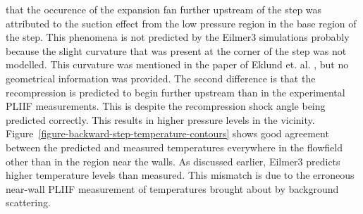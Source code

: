 that the occurence of the expansion fan further upstream of the step was
attributed to the suction effect from the low pressure region in the base region
of the step. This phenomena is not predicted by the Eilmer3 simulations probably because
the slight curvature that was present at the corner of the step was not modelled. 
This curvature was mentioned in the paper of Eklund et. al. \cite{Eklund1995}, but no geometrical
information was provided. The second difference is that the recompression is predicted 
to begin further upstream than in the experimental PLIIF measurements. This is 
despite the recompression shock angle being predicted correctly. This results in 
higher pressure levels in the vicinity.
Figure~\ref{figure-backward-step-temperature-contours} shows good agreement between 
the predicted and measured temperatures everywhere in the flowfield other than in 
the region near the walls. As discussed earlier, Eilmer3 predicts higher temperature 
levels than measured. This mismatch is due to the erroneous near-wall PLIIF measurement 
of temperatures brought about by background scattering.

